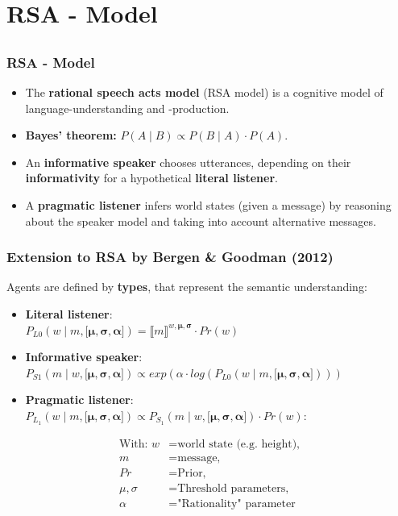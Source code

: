 \documentclass[8pt]{beamer}
\newcommand{\stp}{\item[$\bullet$]}%
\begin{document}
\section{RSA - Model}
\subsection*{}
\begin{frame}
\frametitle{RSA - Model}
\vskip5mm
	\begin{itemize}
		\stp The \textbf{rational speech acts model} (RSA model) is a cognitive model of language-understanding and -production.\newline
		\stp \textbf{Bayes' theorem: } $P(A \mid B) \propto P(B \mid A) \cdot P(A)$.\newline
		\stp An \textbf{informative speaker} chooses utterances, depending on their \textbf{informativity} for a hypothetical \textbf{literal listener}.\newline
		\stp A \textbf{pragmatic listener} infers world states (given a message) by reasoning about the speaker model and taking into account alternative messages. 
	\end{itemize}
\end{frame}

\begin{frame}
\frametitle{Extension to RSA by Bergen \& Goodman (2012)}
\vskip5mm
Agents are defined by \textbf{types}, that represent the semantic understanding:
\vskip5mm
	\begin{itemize}
		\stp \textbf{Literal listener}:\\
		$P_{L0}(w \mid m , \boldsymbol{ \big[ \mu, \sigma, \alpha\big]}) = \llbracket m \rrbracket^{w, \boldsymbol{ \mu,\sigma}} \cdot Pr(w) $\newline
		\stp \textbf{Informative speaker}:\\
		$P_{S1}(m \mid w, \boldsymbol{ \big[ \mu, \sigma, \alpha\big]}) \propto exp(\alpha \cdot log(P_{L0}(w \mid m, \boldsymbol{ \big[ \mu, \sigma, \alpha\big] })))$\newline
		\stp \textbf{Pragmatic listener}:\\
		$P_{L_1}(w \mid m, \boldsymbol{ \big[ \mu, \sigma, \alpha\big]}) \propto P_{S_1}(m \mid w, \boldsymbol{ \big[ \mu, \sigma, \alpha\big]}) \cdot Pr(w)$:
	\end{itemize}
\vskip5mm
\begin{align*}
\text{With: } w &= \text{world state (e.g. height),}\\
m &= \text{message,}\\
Pr &= \text{Prior,} \\
\mu, \sigma &= \text{Threshold parameters,}\\
\alpha &= \text{"Rationality" parameter}
\end{align*}
\end{frame}
\end{document}
